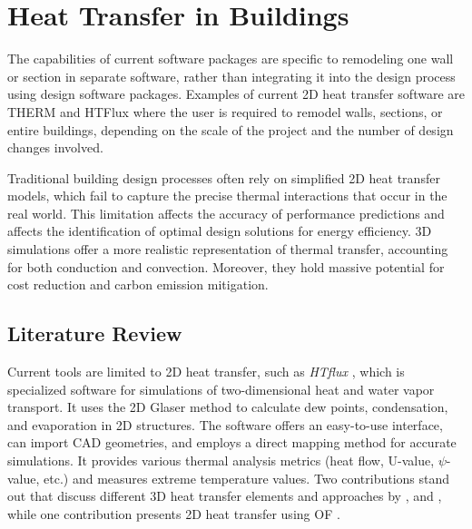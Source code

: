 \chapter{Heat Transfer in Buildings}



The capabilities of current software packages are specific to remodeling one wall or section in separate software, rather than integrating it into the design process using design software packages. Examples of current 2D heat transfer software are THERM and HTFlux where
the user is required to remodel walls, sections, or entire buildings, depending on the scale of the project and the number of design changes involved.

Traditional building design processes often rely on simplified 2D heat transfer models, which fail to capture the precise thermal interactions that occur in the real world. This limitation affects the accuracy of performance predictions and affects the identification of optimal design solutions for energy efficiency. 
3D simulations offer a more realistic representation of thermal transfer, accounting for both conduction and convection. 
Moreover, they hold massive potential for cost reduction and carbon emission mitigation. 






\section{Literature Review}






Current tools are limited to 2D heat transfer, such as \textit{HTflux} \cite{HTflux}, which is specialized software for simulations of two-dimensional heat and water vapor transport.
It uses the 2D Glaser method \cite{glaser1959graphisches} to calculate dew points, condensation, and evaporation in 2D structures. 
The software offers an easy-to-use interface, can import CAD geometries, and employs a direct mapping method for accurate simulations. 
It provides various thermal analysis metrics (heat flow, U-value, $\psi$-value, etc.) and measures extreme temperature values. Two contributions stand out that discuss different 3D heat transfer elements and approaches by  \cite{Yang}, and \cite{COMSOL}, while one contribution presents 2D heat transfer using \gls{OF} \cite{kastner2020solving}.

